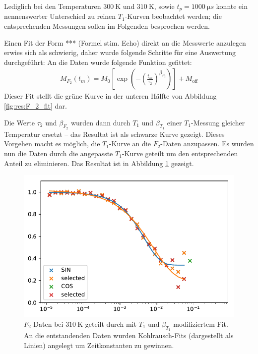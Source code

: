Lediglich bei den Temperaturen $\SI{300}{\kelvin}$ und $\SI{310}{\kelvin}$, sowie $t_p = \SI{1000}{\micro s}$ konnte ein nennenswerter Unterschied zu reinen $T_1$-Kurven beobachtet werden; die entsprechenden Messungen sollen im Folgenden besprochen werden.

Einen Fit der Form *** (Formel stim. Echo) direkt an die Messwerte anzulegen erwies sich als schwierig, daher wurde folgende Schritte für eine Auswertung durchgeführt: An die Daten wurde folgende Funktion gefittet:
\begin{align}
	M_{F_2} (t_m) = M_0 \left[ \exp{ \left(- { \left( \frac{t_m}{\tau_2} \right) }^{\beta_{F_2}} \right)} \right] + M_\text{off} \label{eqn:res:F_2_fit}
\end{align}
Dieser Fit stellt die grüne Kurve in der unteren Hälfte von Abbildung \ref{fig:res:F_2_fit} dar.

Die Werte $\tau_2$ und $\beta_{F_2}$ wurden dann durch $T_1$ und $\beta_{T_1}$ einer $T_1$-Messung gleicher Temperatur ersetzt -- das Resultat ist als schwarze Kurve gezeigt. Dieses Vorgehen macht es möglich, die $T_1$-Kurve an die $F_2$-Daten anzupassen. Es wurden nun die Daten durch die angepasste $T_1$-Kurve geteilt um den entsprechenden Anteil zu eliminieren. Das Resultat ist in Abbildung \ref{fig:res:F_2_T_1} gezeigt.
\begin{figure}
	\begin{center}
		\includegraphics[width=.9\textwidth]{graphics/plots/F2/f2_fit.pdf}
	\end{center}
	\caption{$F_2$-Daten bei $\SI{310}{\kelvin}$ geteilt durch mit $T_1$ und $\beta_{T_1}$ modifiziertem Fit. An die entstandenden Daten wurden Kohlrausch-Fits (dargestellt als Linien) angelegt um Zeitkonstanten zu gewinnen.} \label{fig:res:F_2_T_1}
\end{figure}

